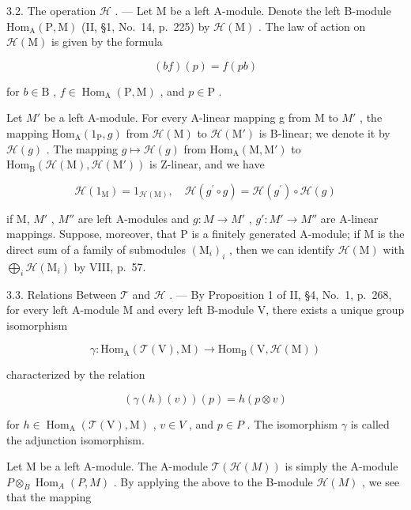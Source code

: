 3.2. The operation \(\mathcal{H}\) . --- Let M be a left A-module. Denote the left B-module \(\mathrm{Hom}_{\mathrm{A}}(\mathrm{P},\mathrm{M})\) (II, §1, No.~14, p.~225) by \(\mathcal{H}(\mathrm{M})\) . The law of action on \(\mathcal{H}(\mathrm{M})\) is given by the formula

\[
(b f) (p) = f (p b)\tag{3}
\]

for \(b \in \mathrm{B}\) , \(f \in \operatorname{Hom}_{\mathrm{A}}(\mathrm{P}, \mathrm{M})\) , and \(p \in \mathrm{P}\) .

Let \(M'\) be a left A-module. For every A-linear mapping g from M to \(M'\) , the mapping \(\mathrm{Hom}_{\mathrm{A}}(1_{\mathrm{P}}, g)\) from \(\mathcal{H}(\mathrm{M})\) to \(\mathcal{H}(\mathrm{M}')\) is B-linear; we denote it by \(\mathcal{H}(g)\) . The mapping \(g \mapsto \mathcal{H}(g)\) from \(\mathrm{Hom}_{\mathrm{A}}(\mathrm{M}, \mathrm{M}')\) to \(\mathrm{Hom}_{\mathrm{B}}(\mathcal{H}(\mathrm{M}), \mathcal{H}(\mathrm{M}'))\) is Z-linear, and we have

\[
\mathcal {H} (1 _ {\mathrm{M}}) = 1 _ {\mathcal {H} (\mathrm{M})}, \quad \mathcal {H} (g ^ {\prime} \circ g) = \mathcal {H} (g ^ {\prime}) \circ \mathcal {H} (g)\tag{4}
\]

if M, \(M'\) , \(M''\) are left A-modules and \(g : M \to M'\) , \(g' : M' \to M''\) are A-linear mappings. Suppose, moreover, that P is a finitely generated A-module; if M is the direct sum of a family of submodules \((\mathrm{M}_{i})_{i}\) , then we can identify \(\mathcal{H}(\mathrm{M})\) with \(\bigoplus_{i} \mathcal{H}(\mathrm{M}_{i})\) by VIII, p.~57.

3.3. Relations Between \(\mathcal{T}\) and \(\mathcal{H}\) . --- By Proposition 1 of II, §4, No.~1, p.~268, for every left A-module M and every left B-module V, there exists a unique group isomorphism

\[
\gamma : \mathrm{Hom} _ {\mathrm{A}} (\mathcal {T} (\mathrm{V}), \mathrm{M}) \longrightarrow \mathrm{Hom} _ {\mathrm{B}} (\mathrm{V}, \mathcal {H} (\mathrm{M}))\tag{5}
\]

characterized by the relation

\[
(\gamma (h) (v)) (p) = h (p \otimes v)\tag{6}
\]

for \(h \in \operatorname{Hom}_{\mathrm{A}}(\mathcal{T}(\mathrm{V}), \mathrm{M})\) , \(v \in V\) , and \(p \in P\) . The isomorphism \(\gamma\) is called the adjunction isomorphism.

Let M be a left A-module. The A-module \(\mathcal{T}(\mathcal{H}(M))\) is simply the A-module \(P \otimes_{B} \operatorname{Hom}_{A}(P, M)\) . By applying the above to the B-module \(\mathcal{H}(M)\) , we see that the mapping

